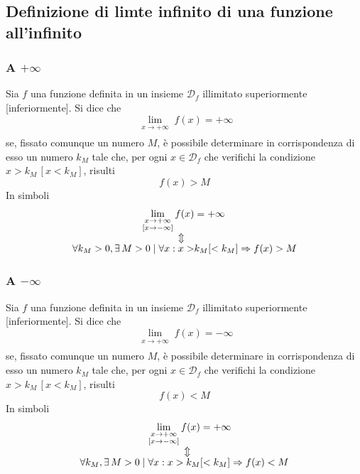\subsection{Definizione di limte infinito di una funzione all'infinito}
\subsubsection{A $+\infty$}
\begin{definizioneLimiteInfinitoInfinito1}
	Sia $f$ una funzione definita in un insieme $\mathscr{D}_f$ illimitato superiormente 
	[inferiormente]. Si dice che
	\begin{equation*}
	\lim\limits_{\substack{x\to+\infty\\ [x\to-\infty]}}f(x)=+\infty
	\end{equation*}
	se, fissato comunque un numero $M$, è possibile determinare in corrispondenza di esso un numero 
	$k_M$ tale che, per ogni $x\in\mathscr{D}_f$ che verifichi la condizione $x>k_M\,[x<k_M]$, risulti
	\begin{equation*}
	f(x)>M
	\end{equation*}
	In simboli
	\begin{align*}
	\lim\limits_{\substack{x\to+\infty\\ [x\to-\infty]}}f(x)&=+\infty\\
	\ArrowBetweenLines
	\forall k_M>0, \exists\,M>0\mid\forall x: x>&k_M[<k_M] \Rightarrow f(x) > M
	\end{align*}
\end{definizioneLimiteInfinitoInfinito1}
\subsubsection{A $-\infty$}
\begin{definizioneLimiteInfinitoInfinito2}
	Sia $f$ una funzione definita in un insieme $\mathscr{D}_f$ illimitato superiormente 
	[inferiormente]. Si dice che
	\begin{equation*}
	\lim\limits_{\substack{x\to+\infty\\ [x\to-\infty]}} f(x)=-\infty
	\end{equation*}
	se, fissato comunque un numero $M$, è possibile determinare in corrispondenza di esso un numero 
	$k_M$ tale che, per ogni $x\in\mathscr{D}_f$ che verifichi la condizione $x>k_M\,[x<k_M]$, risulti
	\begin{equation*}
	f(x)<M
	\end{equation*}
	In simboli
	\begin{align*}
	\lim\limits_{\substack{x\to+\infty\\ [x\to-\infty]}}f(x)&=+\infty\\
	\ArrowBetweenLines
	\forall k_M, \exists\,M>0\mid\forall x: x>k_M&[<k_M] \Rightarrow f(x) < M
	\end{align*}
\end{definizioneLimiteInfinitoInfinito2}

